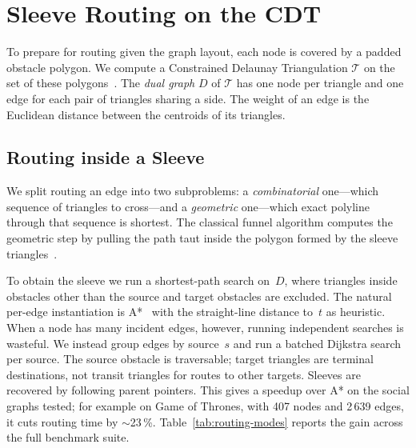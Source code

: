 \documentclass[review]{vgtc}          %
\newcommand{\cdt}{$\mathcal{T}$}
\begin{document}
\section{Sleeve Routing on the CDT}
\label{sec:sleeve-routing}

To prepare for routing given the graph layout, each node is covered by
a padded obstacle polygon. We compute a Constrained Delaunay
Triangulation \cdt{} on the set of these
polygons~\cite{delaunay1934sphere,domiter2008sweep}. The \emph{dual
graph} $D$ of \cdt{} has one node per triangle and one edge for each
pair of triangles sharing a side. The weight of an edge is the
Euclidean distance between the centroids of its triangles.

\subsection{Routing inside a Sleeve}
\label{sec:sleeve}

We split routing an edge into two subproblems: a \emph{combinatorial}
one---which sequence of triangles to cross---and a \emph{geometric}
one---which exact polyline through that sequence is shortest. The
classical funnel algorithm computes the geometric step by pulling
the path taut inside the polygon formed by the sleeve
triangles~\cite{chazelle1982theorem,hershberger1994computing}.

To obtain the sleeve we run a shortest-path search on~$D$, where
triangles inside obstacles other than the source and target obstacles
are excluded. The natural per-edge instantiation is
A*~\cite{hart1968formal} with the straight-line distance to~$t$ as
heuristic. When a node has many incident edges, however, running
independent searches is wasteful. We instead group edges by source~$s$
and run a batched Dijkstra search per source. The source obstacle
is traversable; target triangles are terminal destinations, not
transit triangles for routes to other targets. Sleeves are recovered
by following parent pointers. This gives a speedup over A* on the
social graphs tested; for example on Game of Thrones,
with 407 nodes and 2\,639 edges, it cuts routing time by $\sim$23\,\%.
Table~\ref{tab:routing-modes} reports the gain across the full
benchmark suite.
\end{document}
